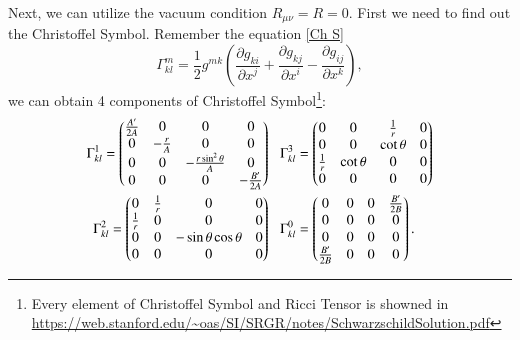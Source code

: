 \documentclass[openany,10pt]{book}
\theoremstyle{definition}
\theoremstyle{definition}
\theoremstyle{remark}
\begin{document}
Next, we can utilize the vacuum condition $R_{\mu\nu}=R=0$. First we need to find out the Christoffel Symbol. Remember the equation \ref{Ch S}
\begin{equation}
    \Gamma^m_{kl}=\frac12 g^{mk}\left(\frac{\partial g_{ki}}{\partial x^j}+\frac{\partial g_{kj}}{\partial x^i}-\frac{\partial g_{ij}}{\partial x^k}\right),
\end{equation}
we can obtain 4 components of Christoffel Symbol\footnote{Every element of Christoffel Symbol and Ricci Tensor is showned in \url{https://web.stanford.edu/~oas/SI/SRGR/notes/SchwarzschildSolution.pdf}}:
\begin{equation}
    \begin{aligned}
        \Gamma^1_{kl}=\begin{pmatrix}
   \frac{A'}{2A}& 0 & 0 & 0\\
   0 & -\frac{r}{A} & 0 & 0\\
   0 & 0 & -\frac{r\sin^2{\theta}}{A} & 0\\
   0 &0 & 0& -\frac{B'}{2A}
  \end{pmatrix}\hspace{3mm}
        &  \Gamma^3_{kl}=\begin{pmatrix}
    0 & 0 & \frac1r & 0\\
   0 & 0 & \cot{\theta} & 0\\
   \frac1r & \cot{\theta} & 0 & 0\\
   0 &0 & 0& 0
  \end{pmatrix}\\
        \Gamma^2_{kl}=\begin{pmatrix}
   0& \frac1r & 0 & 0\\
   \frac1r & 0 & 0 & 0\\
   0 & 0 & -\sin{\theta}\cos{\theta} & 0\\
   0 &0 & 0& 0
  \end{pmatrix}\hspace{3mm}
       & \Gamma^0_{kl}=\begin{pmatrix}
   0 & 0 & 0 & \frac{B'}{2B}\\
   0 & 0 & 0 & 0\\
   0 & 0 & 0 & 0\\
   \frac{B'}{2B} &0 & 0& 0
  \end{pmatrix}.
    \end{aligned}
\end{equation}
\end{document}
